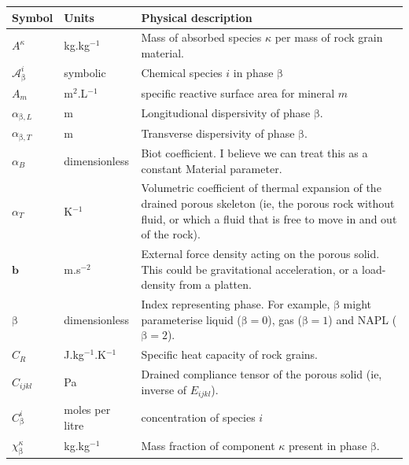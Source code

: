 \documentclass[12pt]{report}
\def\species{\kappa}
\def\phase{\mathrm{\beta}}
\def\massfrac{\chi}
\begin{document}
\begin{longtable}{llp{10cm}}
\hline
{\bf Symbol} & {\bf Units} & {\bf Physical description} \\
\hline\hline
\endhead
$A^{\species}$ & kg.kg$^{-1}$ & Mass of absorbed species $\species$
per mass of rock grain material. \\
$\mathcal{A}^{i}_{\phase}$ & symbolic & Chemical species $i$ in phase $\phase$ \\

$A_{m}$ & m$^{2}$.L$^{-1}$ & specific reactive surface area for
mineral $m$ \\

$\alpha_{\phase,L}$ & m & Longitudional dispersivity of phase
$\phase$. \\

$\alpha_{\phase,T}$ & m & Transverse dispersivity of phase
$\phase$. \\

$\alpha_{B}$ & dimensionless & Biot coefficient.  I believe we can
treat this as a constant Material parameter. \\

$\alpha_{T}$ & K$^{-1}$ & Volumetric coefficient of thermal expansion
of the drained porous skeleton (ie, the porous rock without fluid, or
which a fluid that is free to move in and out of the rock). \\

${\mathbf b}$ & m.s$^{-2}$ & External force density acting on the
porous solid.  This could be gravitational acceleration, or a
load-density from a platten. \\

$\phase$ & dimensionless & Index representing phase.  For example, $\phase$ might
parameterise liquid ($\phase=0$), gas ($\phase=1$) and NAPL ($\phase=2$). \\

$C_{R}$ & J.kg$^{-1}$.K$^{-1}$ & Specific heat capacity of rock
grains. \\

$C_{ijkl}$ & Pa & Drained compliance tensor of the porous solid (ie,
inverse of $E_{ijkl}$). \\

$C_{\phase}^{i}$ & moles per litre & concentration of species $i$ \\

$\massfrac_{\phase}^{\species}$ & kg.kg$^{-1}$ & Mass fraction of
component $\species$ present in phase $\phase$. \\


\end{longtable}
\end{document}
